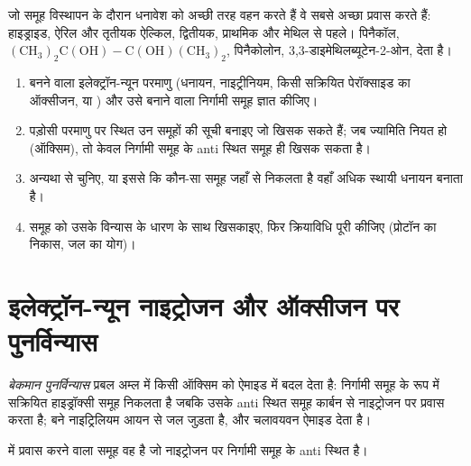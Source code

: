 जो समूह विस्थापन के दौरान धनावेश को अच्छी तरह वहन करते हैं वे सबसे अच्छा प्रवास करते हैं: हाइड्राइड,
ऐरिल और तृतीयक ऐल्किल, द्वितीयक, प्राथमिक और मेथिल से पहले। पिनैकॉल,
$\mathrm{(CH_3)_2C(OH){-}C(OH)(CH_3)_2}$, पिनैकोलोन, 3,3-डाइमेथिलब्यूटेन-2-ओन, देता है।

\begin{method}[पुनर्विन्यास के उत्पाद का पूर्वानुमान]\label{met:b3:radicals-carbenes:rearrangement}
\begin{enumerate}
  \item बनने वाला इलेक्ट्रॉन-न्यून परमाणु (धनायन, नाइट्रीनियम, किसी
        सक्रियित पेरॉक्साइड का ऑक्सीजन,  या ) और उसे बनाने वाला निर्गामी समूह
        ज्ञात कीजिए।
  \item पड़ोसी परमाणु पर स्थित उन समूहों की सूची बनाइए जो खिसक सकते हैं; जब
        ज्यामिति नियत हो (ऑक्सिम), तो केवल निर्गामी समूह के anti स्थित समूह ही खिसक सकता है।
  \item अन्यथा  से चुनिए, या इससे कि कौन-सा समूह जहाँ से निकलता है वहाँ अधिक
        स्थायी धनायन बनाता है।
  \item समूह को उसके विन्यास के धारण के साथ खिसकाइए, फिर
        क्रियाविधि पूरी कीजिए (प्रोटॉन का निकास, जल का योग)।
\end{enumerate}
\end{method}

\section{इलेक्ट्रॉन-न्यून नाइट्रोजन और ऑक्सीजन पर पुनर्विन्यास}

\begin{definition}[बेकमान पुनर्विन्यास]\label{def:b3:radicals-carbenes:beckmann}
\emph{बेकमान पुनर्विन्यास} प्रबल अम्ल में किसी ऑक्सिम को
ऐमाइड में बदल देता है: निर्गामी समूह के रूप में सक्रियित हाइड्रॉक्सी समूह
निकलता है जबकि उसके anti स्थित समूह कार्बन से नाइट्रोजन पर प्रवास करता है; बने
नाइट्रिलियम आयन से जल जुड़ता है, और चलावयवन ऐमाइड देता है।
\end{definition}

\begin{proposition}[anti प्रवास]\label{prop:b3:radicals-carbenes:beckmann-anti}
 में प्रवास करने वाला समूह वह है जो नाइट्रोजन पर
निर्गामी समूह के anti स्थित है।
\end{proposition}

